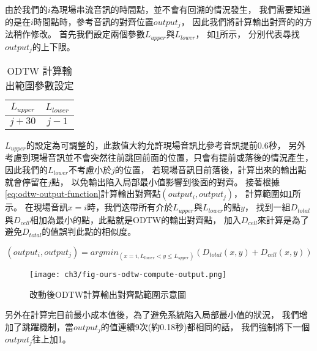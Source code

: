\documentclass[class=NCU_thesis, crop=false]{standalone}
\begin{document}
由於我們的$i$為現場串流音訊的時間點，並不會有回溯的情況發生，
我們需要知道的是在$i$時間點時，參考音訊的對齊位置$output_j$，
因此我們將計算輸出對齊的的方法稍作修改。
首先我們設定兩個參數$L_{upper}$與$L_{lower}$，
如\cref{table:table-odtw-compute-outputj-parameter-setting}所示，
分別代表尋找$output_j$的上下限。
\begin{table}[h]
    \centering
    \caption{ODTW 計算輸出範圍參數設定}
    \label{table:table-odtw-compute-outputj-parameter-setting}
    \begin{tabular}{|c|c|}
        \hline
        \multicolumn{1}{|c|}{$L_{upper}$} & \multicolumn{1}{|c|}{$L_{lower}$}\\
        \hline
        $j+30$ & $j-1$ \\
        \hline
    \end{tabular}
\end{table}
$L_{upper}$的設定為可調整的，此數值大約允許現場音訊比參考音訊提前0.6秒，
另外考慮到現場音訊並不會突然往前跳回前面的位置，只會有提前或落後的情況產生，
因此我們的$L_{lower}$不考慮小於$j$的位置，
若現場音訊目前落後，計算出來的輸出點就會停留在$j$點，
以免輸出陷入局部最小值影響到後面的對齊。
接著根據\cref{eq:odtw-output-function}計算輸出對齊點$(output_i, output_j)$，
計算範圍如\cref{fig:fig-ch3-ours-odtw-compute-output}所示。
在現場音訊$x=i$時，我們迭帶所有介於$L_{upper}$與$L_{lower}$的點$y$，
找到一組$D_{total}$與$D_{cell}$相加為最小的點，此點就是ODTW的輸出對齊點，
加入$D_{cell}$來計算是為了避免$D_{total}$的值誤判此點的相似度。

\begin{equation} 
    \label{eq:odtw-output-function}
    (output_i, output_j) = argmin_{(x=i, L_{lower} < y \leq L_{upper})}(D_{total}(x,y)+D_{cell}(x,y))
\end{equation}

\begin{figure}[H]
    \centering
    \texttt{[image: ch3/fig-ours-odtw-compute-output.png]}
    \caption{改動後ODTW計算輸出對齊點範圍示意圖}
    \label{fig:fig-ch3-ours-odtw-compute-output}
\end{figure}

另外在計算完目前最小成本值後，為了避免系統陷入局部最小值的狀況，
我們增加了跳躍機制，當$output_j$的值連續9次(約0.18秒)都相同的話，
我們強制將下一個$output_j$往上加1。
\end{document}
